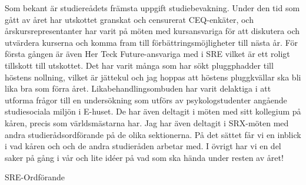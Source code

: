 \documentclass[../_main/handlingar.tex]{subfiles}
\begin{document}

Som bekant är studiereådets främsta uppgift studiebevakning. Under den tid som gått av året har utskottet granskat och censurerat CEQ-enkäter, och årskursrepresentanter har varit på möten med kursansvariga för att diskutera och utvärdera kurserna och komma fram till förbättringsmöjligheter till nästa år. För första gången är även Her Teck Future-ansvariga med i SRE vilket är ett roligt tillskott till utskottet. 
Det har varit många som har sökt pluggphadder till höstens nollning, vilket är jättekul och jag hoppas att höstens pluggkvällar ska bli lika bra som förra året. 
Likabehandlingsombuden har varit delaktiga i att utforma frågor till en undersökning som utförs av psykologstudenter angående studiesociala miljön i E-huset. De har även deltagit i möten med sitt kollegium på kåren, precis som världsmästarna har. 
Jag har även deltagit i SRX-möten med andra studierådsordförande på de olika sektionerna. På det sättet får vi en inblick i vad kåren och och de andra studieråden arbetar med. I övrigt har vi en del saker på gång i vår och lite idéer på vad som ska hända under resten av året!


\begin{signatures}{1}
    \mvh
    \signature{\sreordf}{SRE-Ordförande}
\end{signatures}
\end{document}
